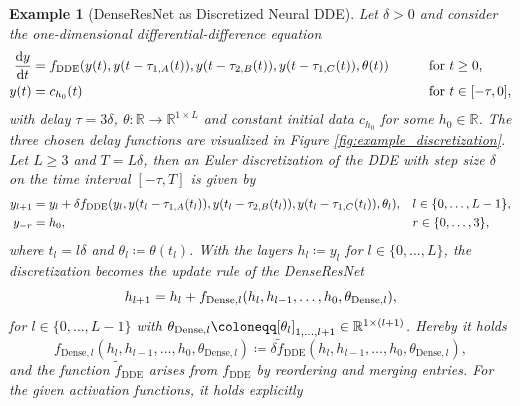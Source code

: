 \documentclass[10pt]{article}
\numberwithin{equation}{section}
\newcommand*{\dd}{\mathrm{d}}
\newtheorem{example}[theorem]{Example}
\newcommand{\R}{\mathbb{R}}
\begin{document}
	\addtocounter{theorem}{1}
	
	\begin{example}[DenseResNet as Discretized Neural DDE]\label{ex:discretization}
		\normalfont Let $\delta>0$ and consider the one-dimensional differential-difference equation
		\begin{equation*}
			\begin{aligned}
				\frac{\dd y}{\dd t} &= f_\textup{DDE}(y(t),y(t-\tau_{1,A}(t)),y(t-\tau_{2,B}(t)),y(t-\tau_{1,C}(t)),\theta(t)) \qquad &&\text{for } t \geq 0, \\  
				y(t) &= c_{h_0}(t) &&\text{for } t \in [-\tau,0],
			\end{aligned}
		\end{equation*}
		with delay $\tau = 3 \delta$, $\theta:\mathbb{R}\rightarrow \mathbb{R}^{1\times L}$ and constant initial data $c_{h_0}$ for some $h_0\in \mathbb{R}$. The three chosen delay functions are visualized in Figure \ref{fig:example_discretization}. Let $L \geq 3$ and $T = L \delta$, then an Euler discretization of the DDE with step size $\delta$ on the time interval $[-\tau,T]$ is given by 
		\begin{equation*}
			\begin{aligned}
				y_{l+1} &= y_{l} + \delta f_\textup{DDE}(y_{l},y(t_l-\tau_{1,A}(t_{l})),y(t_{l}-\tau_{2,B}(t_{l})),y(t_{l}-\tau_{1,C}(t_{l})),\theta_l), && l\in \{0,\ldots,L-1\}, \\
				y_{-r} &= h_0, && r\in \{0,\ldots,3\},
			\end{aligned}
		\end{equation*}
		where $t_l = l\delta$ and $\theta_l \coloneqq \theta(t_l)$. With the layers $h_l \coloneqq y_l$ for $l \in \{0,\ldots,L\}$, the discretization becomes the update rule of the DenseResNet
		\begin{equation*}
			h_{l+1} = h_{l} + f_{\textup{Dense},l}(h_{l}, h_{l-1}, \ldots, h_0, \theta_{\textup{Dense},l}), 
		\end{equation*}
		for $l \in \{0,\ldots,L-1\}$ with $\theta_{\textup{Dense},l} \coloneqq [\theta_l]_{1,\ldots,l+1} \in \R^{1 \times (l+1)}$. Hereby it holds
		\begin{equation*}
			f_{\text{Dense},l}(h_l,h_{l-1},\ldots,h_0,\theta_{\text{Dense},l}) \coloneqq \delta \tilde{f}_\text{DDE}(h_l,h_{l-1},\ldots,h_0,\theta_{\text{Dense},l}),
		\end{equation*}
		and the function $\tilde{f}_\text{DDE}$ arises from $f_\text{DDE}$ by reordering and merging entries. For the given activation functions, it holds explicitly

\end{example}
\end{document}
